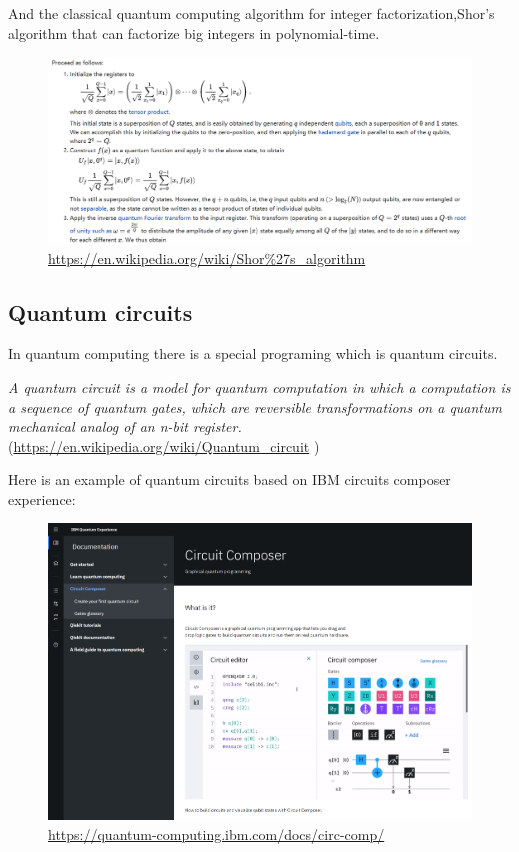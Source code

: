\documentclass{article}
\begin{document}
\newpage

And the classical quantum computing algorithm for integer factorization,Shor's algorithm that can factorize big integers in polynomial-time.

\begin{figure}[htbp]
\centerline{\includegraphics[width=\textwidth]{10.png}}
\caption{\url{https://en.wikipedia.org/wiki/Shor\%27s_algorithm}}
\label{fig}
\end{figure}
\newpage


\subsection{Quantum circuits}
In quantum computing there is a special programing which is quantum circuits.

\emph{A quantum circuit is a model for quantum computation in which a computation is a sequence of quantum gates, which are reversible transformations on a quantum mechanical analog of an n-bit register.}(\url{https://en.wikipedia.org/wiki/Quantum_circuit} )

Here is an example of quantum circuits based on IBM circuits composer experience:


\begin{figure}[htbp]
\centerline{\includegraphics[width=\textwidth]{5.png}}
\caption{\url{https://quantum-computing.ibm.com/docs/circ-comp/}}
\label{fig}
\end{figure}
\end{document}
